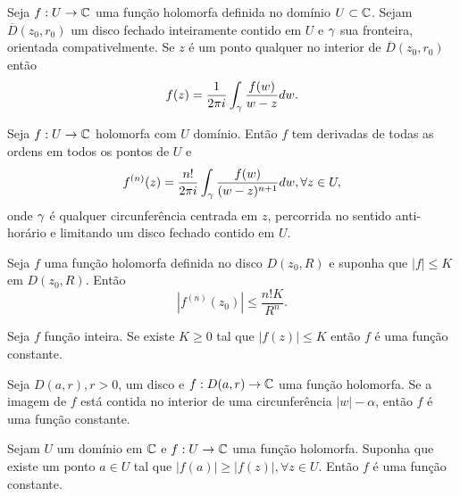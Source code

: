 \begin{teorema}
\label{teo:form-integral-cauchy}
Seja $f:U \to \mathbb{C}$ uma função holomorfa definida no domínio $U\subset\mathbb{C}$.
Sejam $\overline{D}(z_0, r_0)$ um disco fechado inteiramente contido em $U$ e $\gamma$ sua fronteira, orientada compativelmente. 
Se $z$ é um ponto qualquer no interior de $\overline{D}(z_0, r_0)$ então
\begin{equation*}
    f(z) = \frac{1}{2\pi i}\int_{\gamma} \frac{f(w)}{w-z}dw.
\end{equation*}
\end{teorema}


\begin{corolario}
Seja $f:U\to\mathbb{C}$ holomorfa com $U$ domínio. Então $f$ tem derivadas de todas as ordens em todos os pontos de $U$ e
\begin{equation*}
    f^{(n)}(z) = \frac{n!}{2\pi i}\int_{\gamma} \frac{f(w)}{(w-z)^{n+1}}dw, \forall z\in U,
\end{equation*}
onde $\gamma$ é qualquer circunferência centrada em $z$, percorrida no sentido anti-horário e limitando um disco fechado contido em $U$.
\end{corolario}


\begin{corolario}
\label{cor-estimativas-cauchy}
Seja $f$ uma função holomorfa definida no disco $D(z_0, R)$ e suponha que
$|f|\leq K$ em $D(z_0, R)$. Então
\begin{equation*}
    |f^{(n)}(z_0)| \leq \frac{n!K}{R^n}.
\end{equation*}
\end{corolario}


\begin{corolario}
\label{teo-liouville}
Seja $f$ função inteira. Se existe $K\geq 0$ tal que $|f(z)|\leq K$ então $f$ é uma função constante.
\end{corolario}


\begin{lema}
Seja $D(a,r), r>0$, um disco e $f: D(a,r)\to\mathbb{C}$ uma função holomorfa. 
Se a imagem de $f$ está contida no interior de uma circunferência $|w| - \alpha$, então $f$ é uma função constante.
\end{lema}


\begin{corolario}
\label{principio-modulo-maximo}
Sejam $U$ um domínio em $\mathbb{C}$ e $f:U\to\mathbb{C}$ uma função holomorfa.
Suponha que existe um ponto $a\in U$ tal que $|f(a)| \geq |f(z)|, \forall z\in U$. Então $f$ é uma função constante.
\end{corolario}


